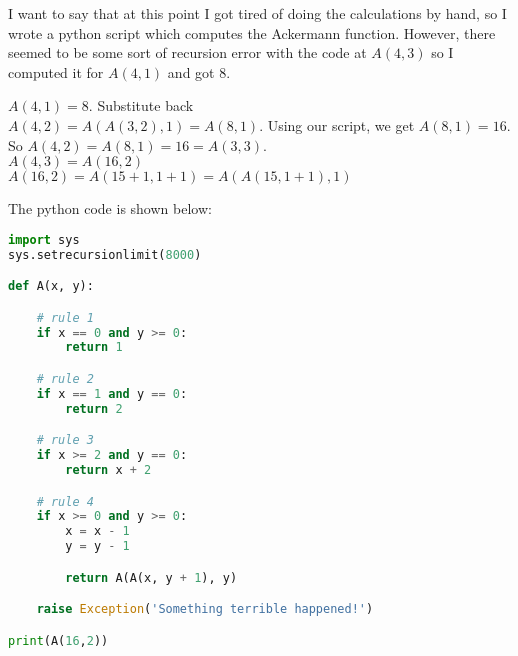 \documentclass[20pt]{article} %
\begin{document}
I want to say that at this point I got tired of doing the calculations by hand, so I wrote a python script which computes the Ackermann function.  However, there seemed to be some sort of recursion error with the code at $A(4,3)$ so I computed it for $A(4,1)$ and got 8.

$A(4,1)=8$. Substitute back \\
$A(4,2) = A(A(3,2), 1) = A(8, 1)$. Using our script, we get $A(8,1) =16$. So $A(4,2) = A(8,1) = 16 = A(3,3)$. \\
$A(4,3) = A(16, 2)$ \\
$A(16, 2) =  A(15 + 1, 1 + 1) = A(A(15, 1+1), 1)$

The python code is shown below:
\begin{lstlisting}[language=python]
import sys
sys.setrecursionlimit(8000)

def A(x, y):

    # rule 1
    if x == 0 and y >= 0:
        return 1

    # rule 2
    if x == 1 and y == 0:
        return 2

    # rule 3
    if x >= 2 and y == 0:
        return x + 2

    # rule 4
    if x >= 0 and y >= 0:
        x = x - 1
        y = y - 1

        return A(A(x, y + 1), y)

    raise Exception('Something terrible happened!')

print(A(16,2))
\end{lstlisting}
\end{document}
